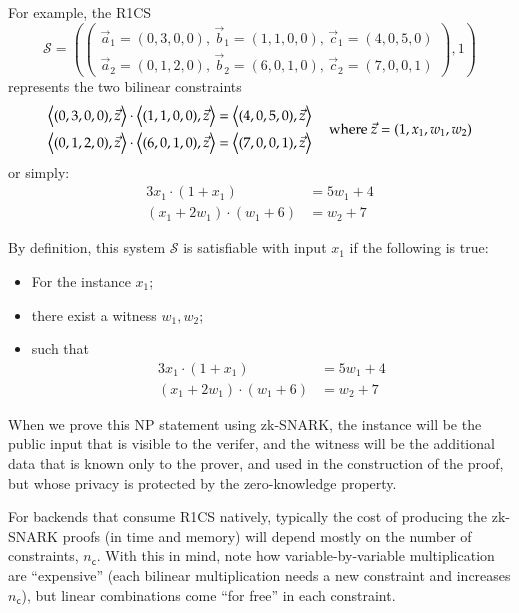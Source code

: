 \documentclass[a4paper,12pt]{article}
\newcommand{\NPstatementNOperiod}[3]{
{\color{NPcolor}
\begin{itemize}[nosep]
\item[] #1;
\item[] #2;
\item[] #3
\end{itemize}
}
}
\newcommand{\enlargeparens}{{\rule{0pt}{2.2ex}}}
\newcommand{\ip}[2]{\left\langle #1 , #2 \right\rangle}
\newcommand{\bigip}[2]{\ip{\enlargeparens #1}{#2}}
\newcommand{\NumConstr}{n_{\mathsf{c}}}
\newcommand{\NumWit}{{n_{\mathsf{w}}}}
\newcommand{\NumInst}{{n_{\mathsf{x}}}}
\newcommand{\inst}{x}
\newcommand{\wit}{w}
\newcommand{\vconc}{\vec{z}}
\newcommand{\lcoef}{a}
\newcommand{\rcoef}{b}
\newcommand{\ocoef}{c}
\newcommand{\System}{\mathcal{S}}
\begin{document}
For example, the R1CS
  \begin{equation}\label{eq:bcs-example-formal}
  \System=\left(\left( 
  \begin{aligned}
   \vec{\lcoef}_1 = (0,3,0,0),\, \vec{\rcoef}_1 = (1,1,0,0),\, \vec{\ocoef}_1 = (4,0,5,0) \\
   \vec{\lcoef}_2 = (0,1,2,0),\, \vec{\rcoef}_2 = (6,0,1,0),\, \vec{\ocoef}_2 = (7,0,0,1)
  \end{aligned}
  \right),1 \right)
  \end{equation}
represents the two bilinear constraints
  \begin{equation}
  \begin{aligned}
  \bigip{(0,3,0,0)}{\vconc}\cdot\bigip{(1,1,0,0)}{\vconc} &= \bigip{(4,0,5,0)}{\vconc} \\
  \bigip{(0,1,2,0)}{\vconc}\cdot\bigip{(6,0,1,0)}{\vconc} &= \bigip{(7,0,0,1)}{\vconc} 
  \end{aligned}
  \quad \mbox{ where } \vconc=(1,\inst_1,\wit_1,\wit_2)
  \end{equation}
or simply:
  \begin{equation}\label{eq:bcs-example-informal}
  \begin{aligned}
  3\inst_1 \cdot (1+\inst_1) &= 5\wit_1 + 4 \\
  (\inst_1 + 2\wit_1) \cdot (\wit_1+6) &= \wit_2 + 7  
  \end{aligned}
  \end{equation}

By definition, this system $\System$ is satisfiable with input $\inst_1$ if the following is true:
\NPstatementNOperiod
  {For the instance $\inst_1$}
  {there exist a witness $\wit_1,\wit_2$}
  {such that
  \begin{equation*}
  \begin{aligned}
  3\inst_1 \cdot (1+\inst_1) &= 5\wit_1 + 4 \\
  (\inst_1 + 2\wit_1) \cdot (\wit_1+6) &= \wit_2 + 7  
  \end{aligned}
  \end{equation*}
  }

When we prove this NP statement using zk-SNARK, the instance will be the public input that is visible to the verifer, and the witness will be the additional data that is known only to the prover, and used in the construction of the proof, but whose privacy is protected by the zero-knowledge property.

For backends that consume R1CS natively, typically the cost of producing the zk-SNARK proofs (in time and memory) will depend mostly on the number of constraints, $\NumConstr$. With this in mind, note how variable-by-variable multiplication are ``expensive'' (each bilinear multiplication needs a new constraint and increases $\NumConstr$), but linear combinations come ``for free'' in each constraint. 
\end{document}
